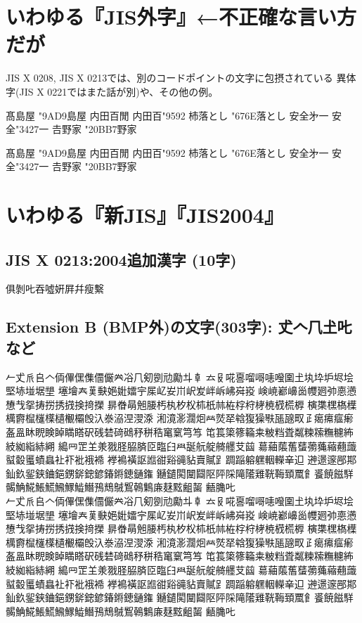\documentclass{ujarticle}
\begin{document}
\section{いわゆる『JIS外字』←不正確な言い方だが}

JIS X 0208, JIS X 0213では、別のコードポイントの文字に包摂されている
異体字(JIS X 0221ではまた話が別)や、その他の例。

髙島屋 \kchar"9AD9島屋\quad%
内田百閒 内田百\kchar"9592\quad%
杮落とし \kchar"676E落とし\quad%
安全﻿㐧一 安全\kchar"3427一\quad%
𠮷野家 \kchar"20BB7野家%

{\gt
髙島屋 \kchar"9AD9島屋\quad%
内田百閒 内田百\kchar"9592\quad%
杮落とし \kchar"676E落とし\quad%
安全﻿㐧一 安全\kchar"3427一\quad%
𠮷野家 \kchar"20BB7野家%
}

\section{いわゆる『新JIS』『JIS2004』}
\subsection{JIS X 0213:2004追加漢字 (10字)}
\noindent
俱剝𠮟吞噓姸屛幷瘦繫

\subsection{Extension B (BMP外)の文字(303字): 𠀋𠆢𠘨𡈽𠮟など}
\noindent
𠂉𠀋𠂢𠂤𠆢𠈓𠌫𠎁𠍱𠏹𠑊𠔉𠗖𠘨𠝏𠠇𠠺𠢹𠥼𠦝
𠫓𠬝𠵅𠷡𠺕𠹭𠹤𠽟𡈁𡈽𡉕𡉻𡉴𡋤𡋗𡌛𡋽𡌶𡍄𡏄
𡑮𡑭𡗗𦰩𡙇𡜆𡝂𡢽𡧃𡱖𡴭𡚴𡵅𡵸𡵢𡶡𡶜𡶒𡶷𡷠
𡸴𡸳𡼞𡽶𡿺𢅻𢌞𢎭𢛳𢡛𢢫𢦏𢪸𢭏𢭐𢭆𢰝𢮦𢰤𢷡
𣇄𣇃𣇵𣆶𣍲𣏓𣏒𣏐𣏤𣏕𣏚𣏟𣑊𣑑𣑋𣑥𣓤𣕚𣗄𣖔
𣘹𣙇𣘸𣘺𣜿𣜜𣝣𣜌𣝤𣟿𣟧𣠤𣠽𣪘𣱿𣳾𣴀𣵀𣷺𣷹
𣷓𣽾𤂖𤄃𤇆𤇾𤎼𤘩𤚥𤟱𤢖𤩍𤭖𤭯𤰖𤴔𤸎𤸷𤹪𤺋
𥁊𥁕𥄢𥆩𥇥𥇍𥈞𥉌𥐮𥒎𥓙𥔎𥖧𥝱𥞩𥞴𥧄𥧔𥫤𥫣
𥫱𥮲𥱋𥱤𥶡𥸮𥹖𥹥𥹢𥻘𥻂𥻨𥼣𥽜𥿠𥿔𦀌𥿻𦀗𦁠
𦃭𦉰𦊆𦍌𣴎𦐂𦙾𦚰𦜝𦣝𦣪𦥑𦥯𦧝𦨞𦩘𦪌𦪷𦫿𦱳
𦳝𦹀𦹥𦾔𦿸𦿶𦿷𧃴𧄍𧄹𧏛𧏚𧏾𧐐𧑉𧘕𧘔𧘱𧚄𧚓
𧜎𧜣𧝒𧦅𧪄𧮳𧮾𧯇𧲸𧶠𧸐𧾷𨂊𨂻𨉷𨊂𨋳𨏍𨐌𨑕
𨕫𨗈𨗉𨛗𨛺𨥉𨥆𨥫𨦇𨦈𨦺𨦻𨨞𨨩𨩱𨩃𨪙𨫍𨫤𨫝
𨯁𨯯𨴐𨵱𨷻𨸟𨸶𨺉𨻫𨼲𨿸𩊠𩊱𩒐𩗏𩙿𩛰𩜙𩝐𩣆
𩩲𩷛𩸽𩸕𩺊𩹉𩻄𩻩𩻛𩿎𪀯𪀚𪃹𪂂𪆐𢈘𪎌𪐷𪗱𪘂
𪘚𪚲𠮟\\
%
{\gt
𠂉𠀋𠂢𠂤𠆢𠈓𠌫𠎁𠍱𠏹𠑊𠔉𠗖𠘨𠝏𠠇𠠺𠢹𠥼𠦝
𠫓𠬝𠵅𠷡𠺕𠹭𠹤𠽟𡈁𡈽𡉕𡉻𡉴𡋤𡋗𡌛𡋽𡌶𡍄𡏄
𡑮𡑭𡗗𦰩𡙇𡜆𡝂𡢽𡧃𡱖𡴭𡚴𡵅𡵸𡵢𡶡𡶜𡶒𡶷𡷠
𡸴𡸳𡼞𡽶𡿺𢅻𢌞𢎭𢛳𢡛𢢫𢦏𢪸𢭏𢭐𢭆𢰝𢮦𢰤𢷡
𣇄𣇃𣇵𣆶𣍲𣏓𣏒𣏐𣏤𣏕𣏚𣏟𣑊𣑑𣑋𣑥𣓤𣕚𣗄𣖔
𣘹𣙇𣘸𣘺𣜿𣜜𣝣𣜌𣝤𣟿𣟧𣠤𣠽𣪘𣱿𣳾𣴀𣵀𣷺𣷹
𣷓𣽾𤂖𤄃𤇆𤇾𤎼𤘩𤚥𤟱𤢖𤩍𤭖𤭯𤰖𤴔𤸎𤸷𤹪𤺋
𥁊𥁕𥄢𥆩𥇥𥇍𥈞𥉌𥐮𥒎𥓙𥔎𥖧𥝱𥞩𥞴𥧄𥧔𥫤𥫣
𥫱𥮲𥱋𥱤𥶡𥸮𥹖𥹥𥹢𥻘𥻂𥻨𥼣𥽜𥿠𥿔𦀌𥿻𦀗𦁠
𦃭𦉰𦊆𦍌𣴎𦐂𦙾𦚰𦜝𦣝𦣪𦥑𦥯𦧝𦨞𦩘𦪌𦪷𦫿𦱳
𦳝𦹀𦹥𦾔𦿸𦿶𦿷𧃴𧄍𧄹𧏛𧏚𧏾𧐐𧑉𧘕𧘔𧘱𧚄𧚓
𧜎𧜣𧝒𧦅𧪄𧮳𧮾𧯇𧲸𧶠𧸐𧾷𨂊𨂻𨉷𨊂𨋳𨏍𨐌𨑕
𨕫𨗈𨗉𨛗𨛺𨥉𨥆𨥫𨦇𨦈𨦺𨦻𨨞𨨩𨩱𨩃𨪙𨫍𨫤𨫝
𨯁𨯯𨴐𨵱𨷻𨸟𨸶𨺉𨻫𨼲𨿸𩊠𩊱𩒐𩗏𩙿𩛰𩜙𩝐𩣆
𩩲𩷛𩸽𩸕𩺊𩹉𩻄𩻩𩻛𩿎𪀯𪀚𪃹𪂂𪆐𢈘𪎌𪐷𪗱𪘂
𪘚𪚲𠮟
}
\end{document}
